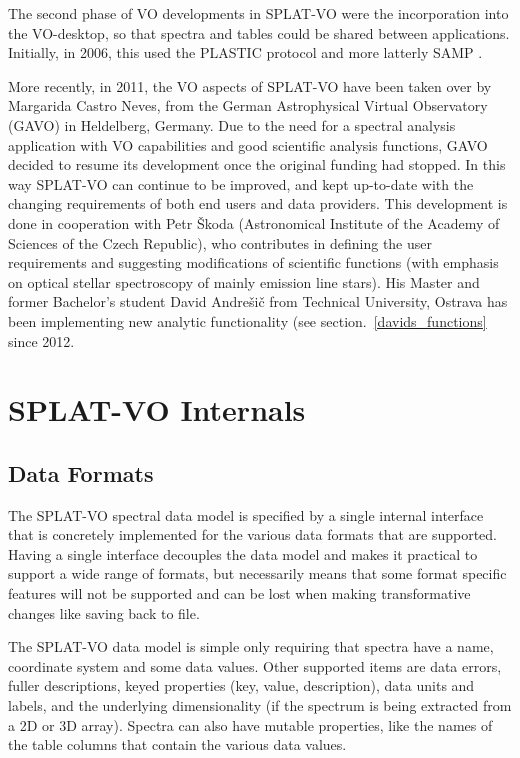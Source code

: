 \documentclass[final,authoryear,5p,times,twocolumn]{elsarticle}
\begin{document}
The second phase of VO developments in SPLAT-VO were the incorporation
into the VO-desktop, so that spectra and tables could be shared
between applications.  Initially, in 2006, this used the PLASTIC
\citep{2007ASPC..376..511T} protocol and more latterly SAMP
\citep{2012ASPC..461..279T}.

More recently, in 2011, the VO aspects of SPLAT-VO have been taken over by Margarida
Castro Neves, from the German Astrophysical Virtual Observatory (GAVO) in
Heldelberg, Germany.  Due to the need for a spectral analysis application with
VO capabilities and good scientific analysis functions, GAVO  decided to resume
its development once the original funding had stopped. In this way SPLAT-VO can
continue to be improved, and kept up-to-date with the changing requirements of
both end users and data providers.  This development  is done in cooperation
with Petr \v{S}koda (Astronomical Institute of the Academy of Sciences of the
Czech Republic), who contributes in defining the user requirements and
suggesting modifications of scientific functions (with emphasis on optical
stellar spectroscopy of mainly  emission line stars).  His Master and former
Bachelor's student David Andre\v{s}i\v{c} from Technical University, Ostrava has been
implementing new analytic functionality (see section.~\ref{davids_functions} since 2012.

\section{SPLAT-VO Internals}

\subsection{Data Formats}

The SPLAT-VO spectral data model is specified by a single internal interface
that is concretely implemented for the various data formats that are
supported. Having a single interface decouples the data model and makes it
practical to support a wide range of formats, but necessarily means that some
format specific features will not be supported and can be lost when making
transformative changes like saving back to file.

The SPLAT-VO data model is simple only requiring that spectra have a name,
coordinate system and some data values. Other supported items are data errors,
fuller descriptions, keyed properties (key, value, description), data units
and labels, and the underlying dimensionality (if the spectrum is being
extracted from a 2D or 3D array). Spectra can also have mutable properties,
like the names of the table columns that contain the various data values.
\end{document}
